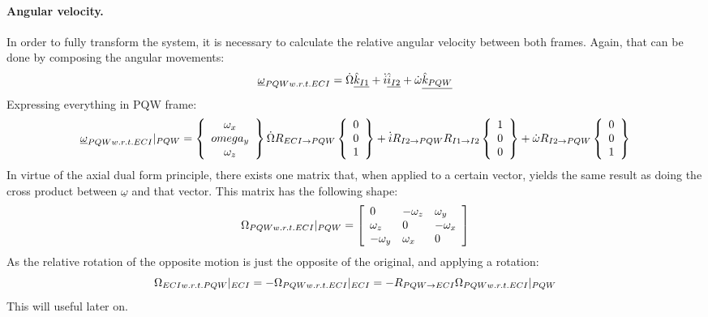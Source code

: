 			\paragraph{Angular velocity. \\}
			\indent In order to fully transform the system, it is necessary to calculate the relative angular velocity between both frames. Again, that can be done by composing the angular movements:
			\[
			\underline{\omega}_{PQW w.r.t. ECI} = \dot{\Omega} \underline{\hat{k}_{I1}} + \dot{i} \underline{\hat{i}_{I2}} + \dot{\omega} \underline{\hat{k}_{PQW}}
			\]
			\indent Expressing everything in PQW frame:
			\[
			\underline{\omega}_{PQW w.r.t. ECI}\rvert_{PQW} = \left\{\begin{array}{c} \omega_x \\ omega_y \\ \omega_z \end{array}\right\}\dot{\Omega} R_{ECI\rightarrow PQW} \left\{\begin{array}{c} 0 \\ 0 \\ 1 \end{array}\right\} + \dot{i} R_{I2 \rightarrow PQW}R_{I1 \rightarrow I2} \left\{\begin{array}{c} 1 \\ 0 \\ 0 \end{array}\right\} + \dot{\omega} R_{I2 \rightarrow PQW} \left\{\begin{array}{c} 0 \\ 0 \\ 1 \end{array}\right\}
			\]
			\indent In virtue of the axial dual form principle, there exists one matrix that, when applied to a certain vector, yields the same result as doing the cross product between $\underline{\omega}$ and that vector. This matrix has the following shape:
			\[
			\Omega_{PQW w.r.t. ECI}\rvert_{PQW} = \left[ \begin{array}{lll}
			0 			& -\omega_z & \omega_y \\
			\omega_z 	& 0 		& -\omega_x \\
			-\omega_y 	& \omega_x 	& 0
			\end{array}\right]
			\]
			\indent As the relative rotation of the opposite motion is just the opposite of the original, and applying a rotation:
			\[
			\Omega_{ECI w.r.t. PQW}\rvert_{ECI} = - \Omega_{PQW w.r.t. ECI}\rvert_{ECI} = - R_{PQW\rightarrow ECI} \Omega_{PQW w.r.t. ECI}\rvert_{PQW}
			\]
			\indent This will useful later on. 
